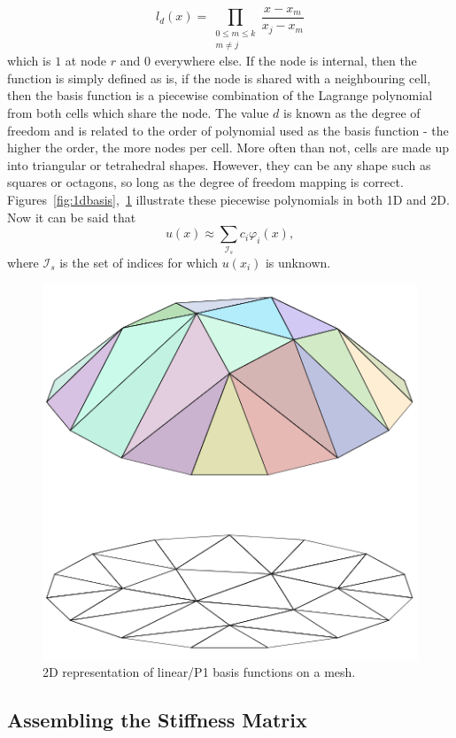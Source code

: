 \begin{equation}
	l_d(x) = \prod_{\substack{0\leq m\leq k \\ m\neq j}}\frac{x-x_m}{x_j-x_m} 
\end{equation}
which is $1$ at node $r$ and $0$ everywhere else. If the node is internal, then the function is simply defined as is, if the node is shared with a neighbouring cell, then the basis function is a piecewise combination of the Lagrange polynomial from both cells which share the node. The value $d$ is known as the degree of freedom and is related to the order of polynomial used as the basis function - the higher the order, the more nodes per cell. More often than not, cells are made up into triangular or tetrahedral shapes. However, they can be any shape such as squares or octagons, so long as the degree of freedom mapping is correct. Figures~\ref{fig:1dbasis},~\ref{fig:2dbasis} illustrate these piecewise polynomials in both 1D and 2D. Now it can be said that
\begin{equation}\label{femapprox}
	u(x) \approx \sum_{\mathcal{I}_s} c_i \varphi_i(x),
\end{equation}
where $\mathcal{I}_s$ is the set of indices for which $u(x_i)$ is unknown.

\begin{figure}
	\centering
	\includegraphics[width=0.4\linewidth]{Figures/Piecewise_linear_function2D}
	\caption{2D representation of linear/P1 basis functions on a mesh.}
	\label{fig:2dbasis}
\end{figure}

\subsection{Assembling the Stiffness Matrix}

